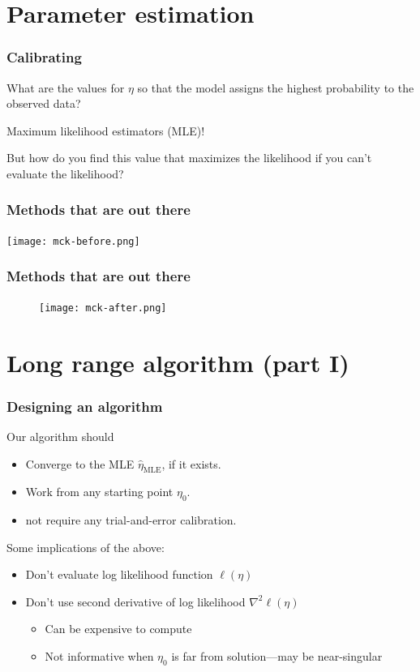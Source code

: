 \documentclass[slidestop,compress, 10pt]{beamer}
\newcommand{\etaMLE}{\hat{\eta}_{\textrm{MLE}}}
\begin{document}
\section{Parameter estimation}
\frame
{
\frametitle{Calibrating}
What are the values for $\eta$ so that the model assigns the highest probability to the observed data?

Maximum likelihood estimators (MLE)!

But how do you find this value that maximizes the likelihood if you can't evaluate the likelihood?
}

\frame
{
\frametitle{Methods that are out there}
\begin{center} 
\texttt{[image: mck-before.png]}
\end{center} 
}
\frame
{
\frametitle{Methods that are out there}
\begin{figure}
\begin{center} 
\texttt{[image: mck-after.png]}
\end{center} 
\end{figure}
}
\section{Long range algorithm (part I)}
\frame
{
\frametitle{Designing an algorithm}

Our algorithm should
\begin{itemize}
\item Converge to the MLE $\etaMLE$, if it exists.
\item Work from any starting point $\eta_0$.
\item not require any trial-and-error calibration.
\end{itemize}

Some implications of the above:
\begin{itemize}
\item Don't evaluate log likelihood function $\ell( \eta)$
\item Don't use second derivative of log likelihood $\nabla^2 \ell( \eta)$
\begin{itemize}
	\item Can be expensive to compute
	\item Not informative when $\eta_0$ is far from solution---may be near-singular
\end{itemize}
\end{itemize}
}
\end{document}
